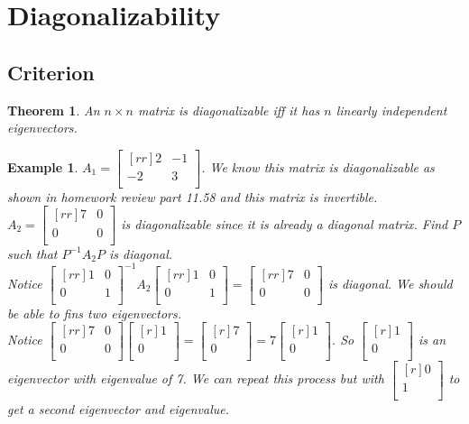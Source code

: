 \documentclass{report}
\newtheorem*{ex}{Example}
\newtheorem*{thrm}{Theorem}
\begin{document}
\section{Diagonalizability}
\subsection{Criterion}
\begin{thrm}
An $n\times n$ matrix is diagonalizable iff it has $n$ linearly independent eigenvectors.
\end{thrm}
\begin{ex}
$A_1=\begin{bmatrix}[rr]2&-1\\-2&3\\\end{bmatrix}$. We know this matrix is diagonalizable as shown in homework review part 11.58 and this matrix is invertible.
$A_2 = \begin{bmatrix}[rr]7&0\\0&0\\\end{bmatrix}$ is diagonalizable since it is already a diagonal matrix. Find $P$ such that $P^{-1}A_2P$ is diagonal.\\
Notice $\begin{bmatrix}[rr]1&0\\0&1\\\end{bmatrix}^{-1}A_2\begin{bmatrix}[rr]1&0\\0&1\\\end{bmatrix}=\begin{bmatrix}[rr]7&0\\0&0\\\end{bmatrix}$ is diagonal. We should be able to fins two eigenvectors.\\
Notice $\begin{bmatrix}[rr]7&0\\0&0\\\end{bmatrix}\begin{bmatrix}[r]1\\0\\\end{bmatrix}=\begin{bmatrix}[r]7\\0\\\end{bmatrix}=7\begin{bmatrix}[r]1\\0\\\end{bmatrix}$. So $\begin{bmatrix}[r]1\\0\\\end{bmatrix}$ is an eigenvector with eigenvalue of 7. We can repeat this process but with $\begin{bmatrix}[r]0\\1\\\end{bmatrix}$ to get a second eigenvector and eigenvalue.\\

\end{ex}
\end{document}
